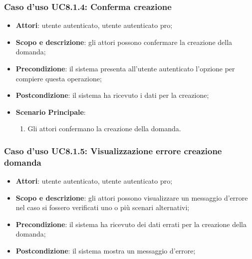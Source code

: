 	\subsubsection{Caso d'uso UC8.1.4: Conferma creazione}
	\begin{itemize}
		\item
			\textbf{Attori}: utente autenticato, utente autenticato pro;
		\item
			\textbf{Scopo e descrizione}: gli attori possono confermare la creazione della domanda;
		\item		
			\textbf{Precondizione}: il sistema presenta all'utente autenticato l'opzione per compiere questa operazione;
		\item
			\textbf{Postcondizione}: il sistema ha ricevuto i dati per la creazione;
		\item
			\textbf{Scenario Principale}:  
					\begin{enumerate}
						\item
							Gli attori confermano la creazione della domanda.
					\end{enumerate}
	\end{itemize}	
	\subsubsection{Caso d'uso UC8.1.5: Visualizzazione errore creazione domanda}
	\begin{itemize}
		\item
			\textbf{Attori}: utente autenticato, utente autenticato pro;
		\item
			\textbf{Scopo e descrizione}: gli attori possono visualizzare un messaggio d'errore nel caso si fossero verificati uno o più scenari alternativi;
		\item		
			\textbf{Precondizione}: il sistema ha ricevuto dei dati errati per la creazione della domanda;
		\item
			\textbf{Postcondizione}: il sistema mostra un messaggio d'errore;
	\end{itemize}	






